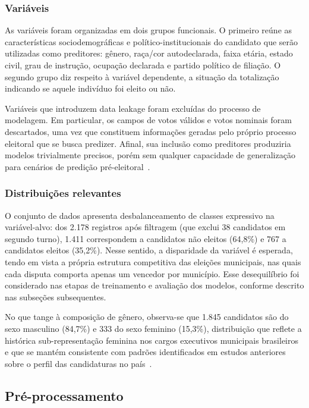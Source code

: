 \documentclass[12pt]{article}
\begin{document}
\subsubsection{Variáveis}

As variáveis foram organizadas em dois grupos funcionais. O primeiro reúne as características
sociodemográficas e político-institucionais do candidato que serão utilizadas como preditores:
gênero, raça/cor autodeclarada, faixa etária, estado civil, grau de instrução, ocupação declarada e partido político de filiação. O segundo grupo diz respeito à
variável dependente, a situação da totalização indicando se aquele indivíduo foi eleito ou não.

Variáveis que introduzem data leakage foram excluídas do processo de modelagem. Em particular,
os campos de votos válidos e votos nominais foram descartados, uma vez que constituem informações
geradas pelo próprio processo eleitoral que se busca predizer. Afinal, sua inclusão como preditores
produziria modelos trivialmente precisos, porém sem qualquer capacidade de generalização para
cenários de predição pré-eleitoral~\cite{kaufman:2012}.

\subsubsection{Distribuições relevantes}

O conjunto de dados apresenta desbalanceamento de classes expressivo na variável-alvo: dos 2.178
registros após filtragem (que exclui 38 candidatos em segundo turno), 1.411 correspondem a candidatos não eleitos (64,8\%) e 767 a candidatos eleitos (35,2\%). Nesse sentido, a disparidade da variável é esperada, tendo em vista a própria
estrutura competitiva das eleições municipais, nas quais cada disputa comporta apenas um vencedor
por município. Esse desequilíbrio foi considerado nas etapas de treinamento e avaliação dos modelos,
conforme descrito nas subseções subsequentes.

No que tange à composição de gênero, observa-se que 1.845 candidatos são do sexo masculino (84,7\%)
e 333 do sexo feminino (15,3\%), distribuição que reflete a histórica sub-representação feminina nos
cargos executivos municipais brasileiros e que se mantém consistente com padrões identificados em
estudos anteriores sobre o perfil das candidaturas no país~\cite{miguel:2010}.

\subsection{Pré-processamento}
\end{document}
